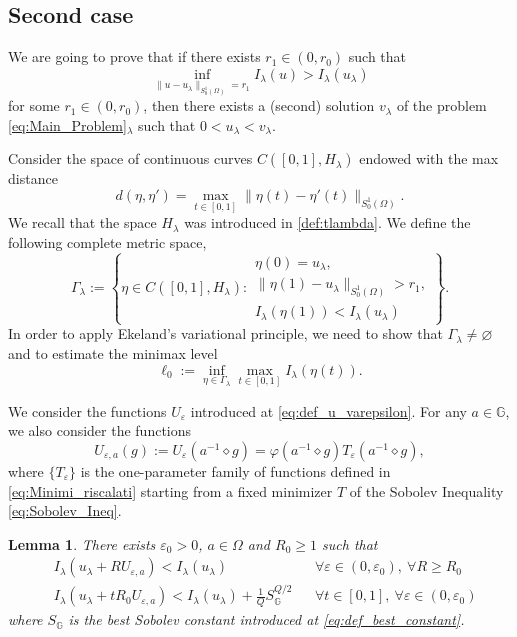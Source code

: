 \documentclass[11pt]{amsart}
\numberwithin{equation}{section} %
\newtheorem{lemma}[teo]{Lemma}
\theoremstyle{definition}
\def\G{\mathbb{G}}
\begin{document}
\subsection{Second case} \label{subsec:CaseII}

We are going to prove that if there exists $r_1\in(0,r_0)$ such that
\begin{equation}\label{eq:case2}
\inf_{\|u-u_\lambda\|_{S^{1}_{0}(\Omega)}=r_1}I_\lambda(u)>I_\lambda(u_\lambda)
\end{equation}
for some $r_1\in (0,r_0)$, then 
there exists a (second) solution $v_\lambda$ of the problem \eqref{eq:Main_Problem}$_\lambda$
such that $0<u_\lambda<v_\lambda$.

Consider the  space of continuous curves
$C([0,1],H_\lambda)$ endowed with the max distance
\begin{equation}\label{maxdistance}
d(\eta,\eta')=\max_{t\in[0,1]}\|\eta(t)-\eta'(t)\|_{S^1_0(\Omega)}.
\end{equation}
We recall that the space $H_\lambda$ was introduced in \eqref{def:tlambda}.
We define the following complete metric space,
\begin{equation}\label{def:gammal}
\Gamma_\lambda:=\left\{\eta\in C([0,1],H_\lambda):\begin{array}{l}
	 \eta(0)=u_\lambda,\\[0.1cm] 
	\|\eta(1)-u_\lambda\|_{S^{1}_{0}(\Omega)}>r_1,\\[0.1cm]
	I_\lambda(\eta(1))<I_\lambda(u_\lambda)
\end{array}
\right\}.
\end{equation}
In order to apply Ekeland's variational principle,
we need to show that $\Gamma_\lambda\neq \varnothing$
and to estimate the minimax level
\[
\ell_0:=\inf_{\eta\in\Gamma_\lambda}\max_{t\in[0,1]}I_\lambda(\eta(t)).
\]

We consider the functions $U_\varepsilon$ introduced
at \eqref{eq:def_u_varepsilon}.
For any $a\in \G$, we also consider the functions
\[
U_{\varepsilon,a}(g):=U_\varepsilon(a^{-1}\diamond g)
= {\varphi(a^{-1}\diamond g) T_{\varepsilon}(a^{-1}\diamond g)},
\]
where $\{T_\varepsilon\}$ is the one-parameter family 
of functions defined in \eqref{eq:Minimi_riscalati} starting from a fixed minimizer $T$
of the Sobolev Inequality \eqref{eq:Sobolev_Ineq}.


\begin{lemma}\label{lem:claim2.7haitao}
	There exists $\varepsilon_0>0$, $a\in\Omega$ and $R_0\geq1$ such that
\begin{align}
	 & I_\lambda(u_\lambda + R U_{\varepsilon,a}) < I_\lambda(u_\lambda) 
	&& \forall \varepsilon \in (0, \varepsilon_0),\ \forall R \geq R_0 \\
& I_\lambda(u_\lambda + t R_0 U_{\varepsilon,a}) < I_\lambda(u_\lambda) + \frac{1}{Q} S_\G^{Q/2} 
	&& \forall t \in [0, 1],\ \forall \varepsilon \in (0, \varepsilon_0)\label{eq:lemma2.7Haitao}
\end{align}
where $S_\G$ is the best Sobolev constant introduced at \eqref{eq:def_best_constant}.
\end{lemma}
\proof
\end{document}
